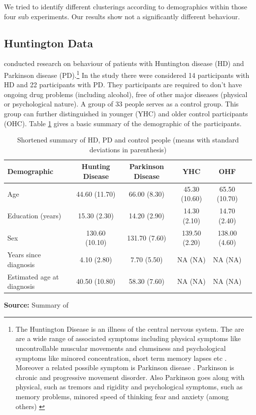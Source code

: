 \documentclass[12pt,a4paper,bibliography=totocnumbered,listof=totocnumbered]{scrartcl}
\begin{document}
We tried to identify different clusterings according to demographics within those four sub experiments. Our results show not a significantly different behaviour. 

\subsection{Huntington Data}

\cite{Stout2001} conducted research on behaviour of patients with Huntington disease (HD) and Parkinson disease (PD).\footnote{The Huntington Disease is an illness of the central nervous system. The are are a wide range of associated symptoms including physical symptoms like uncontrollable muscular movements and clumsiness and psychological symptoms like minored concentration, short term memory lapses etc . Moreover a related possible symptom is Parkinson disease \cite{hunt}. Parkinson is chronic and progressive movement  disorder. Also Parkinson goes along with physical, such as tremors and rigidity and psychological symptoms, such as memory problems, minored speed of thinking fear and anxiety (among others) \cite{parc}} 
In the study there were considered 14 participants with HD and 22 participants with PD. They participants are required to don't have ongoing drug problems (including alcohol), free of other major diseases (physical or psychological nature). A group of 33 people serves as a control group. This group can further distinguished in younger (YHC) and older control participants (OHC). Table \ref{tab:hus} gives a basic summary of the demographic of the participants.

\setlength{\tabcolsep}{10pt}
\renewcommand{\arraystretch}{1}
\begin{table}[!htbp]
	\centering 
	\scriptsize
	\begin{tabularx}{\textwidth}{lccccc}
		\toprule
		\textbf{Demographic} & \textbf{Hunting Disease} & \textbf{Parkinson Disease} & \textbf{YHC} & \textbf{OHF} \\
		\hline
		Age & 		44.60 (11.70) & 66.00 (8.30) & 45.30 (10.60) & 65.50 (10.70) \\
		Education (years) & 15.30 (2.30) & 14.20 (2.90) & 14.30 (2.10) &14.70 (2.40) \\
		Sex & 130.60 (10.10) & 131.70 (7.60) & 139.50 (2.20) & 138.00 (4.60) \\
		Years since diagnosis & 4.10 (2.80) & 7.70 (5.50) & NA (NA) & NA (NA) \\
		Estimated age at diagnosis & 40.50 (10.80) & 58.30 (7.60) & NA (NA) & NA (NA) \\
		\bottomrule
	\end{tabularx}
	\caption{Shortened summary of HD, PD and control people (means with standard deviations in parenthesis)}
	\label{tab:hus}
	\textbf{Source:} Summary of \cite[page 3]{Stout2001} 
\end{table}
\end{document}
